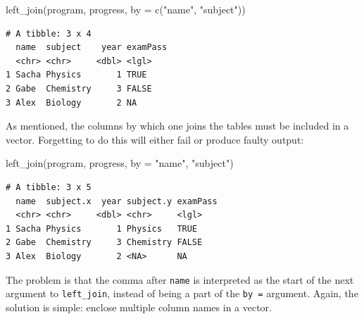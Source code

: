 \documentclass[
  letterpaper,
  DIV=11,
  numbers=noendperiod]{scrreprt}
\newenvironment{Shaded}{\begin{snugshade}}{\end{snugshade}}
\newcommand{\AttributeTok}[1]{\textcolor[rgb]{0.40,0.45,0.13}{#1}}
\newcommand{\FunctionTok}[1]{\textcolor[rgb]{0.28,0.35,0.67}{#1}}
\newcommand{\NormalTok}[1]{\textcolor[rgb]{0.00,0.23,0.31}{#1}}
\newcommand{\StringTok}[1]{\textcolor[rgb]{0.13,0.47,0.30}{#1}}
\begin{document}
\begin{Shaded}
\begin{Highlighting}[]
\FunctionTok{left\_join}\NormalTok{(program, progress, }\AttributeTok{by =} \FunctionTok{c}\NormalTok{(}\StringTok{"name"}\NormalTok{, }\StringTok{"subject"}\NormalTok{))}
\end{Highlighting}
\end{Shaded}

\begin{verbatim}
# A tibble: 3 x 4
  name  subject    year examPass
  <chr> <chr>     <dbl> <lgl>   
1 Sacha Physics       1 TRUE    
2 Gabe  Chemistry     3 FALSE   
3 Alex  Biology       2 NA      
\end{verbatim}

\begin{tcolorbox}[enhanced jigsaw, leftrule=.75mm, rightrule=.15mm, breakable, titlerule=0mm, colframe=quarto-callout-warning-color-frame, left=2mm, opacityback=0, coltitle=black, colback=white, title=\textcolor{quarto-callout-warning-color}{\faExclamationTriangle}\hspace{0.5em}{Warning}, bottomtitle=1mm, colbacktitle=quarto-callout-warning-color!10!white, arc=.35mm, toptitle=1mm, bottomrule=.15mm, toprule=.15mm, opacitybacktitle=0.6]
As mentioned, the columns by which one joins the tables must be included
in a vector. Forgetting to do this will either fail or produce faulty
output:

\begin{Shaded}
\begin{Highlighting}[]
\FunctionTok{left\_join}\NormalTok{(program, progress, }\AttributeTok{by =} \StringTok{"name"}\NormalTok{, }\StringTok{"subject"}\NormalTok{)}
\end{Highlighting}
\end{Shaded}

\begin{verbatim}
# A tibble: 3 x 5
  name  subject.x  year subject.y examPass
  <chr> <chr>     <dbl> <chr>     <lgl>   
1 Sacha Physics       1 Physics   TRUE    
2 Gabe  Chemistry     3 Chemistry FALSE   
3 Alex  Biology       2 <NA>      NA      
\end{verbatim}

The problem is that the comma after \texttt{name} is interpreted as the
start of the next argument to \texttt{left\_join}, instead of being a
part of the \texttt{by\ =} argument. Again, the solution is simple:
enclose multiple column names in a vector.
\end{tcolorbox}
\end{document}

